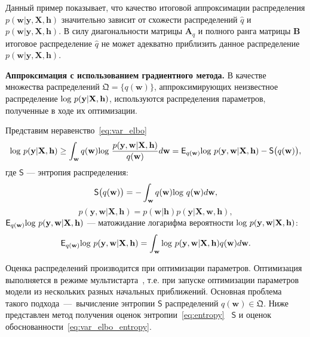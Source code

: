 \begin{example}
{Данный пример показывает, что качество итоговой аппроксимации распределения $p(\mathbf{w}|\mathbf{y}, \mathbf{X}, \mathbf{h})$ значительно зависит от схожести распределений $\hat{q}$ и $p(\mathbf{w}|\mathbf{y}, \mathbf{X}, \mathbf{h})$. В силу диагональности матрицы $\mathbf{A}_q$ и полного ранга матрицы $\mathbf{B}$  итоговое распределение $\hat{q}$ не может адекватно приблизить данное распределение  $p(\mathbf{w}|\mathbf{y}, \mathbf{X}, \mathbf{h})$.}

\end{example}

\textbf{Аппроксимация с использованием градиентного метода. }
В качестве множества распределений $\mathfrak{Q} = \{q(\mathbf{w})\}$, аппроксимирующих неизвестное распределение $\textnormal{log}~p(\mathbf{y}|\mathbf{X},\mathbf{h})$, используются распределения параметров, полученные в ходе их оптимизации.

Представим неравенство~\eqref{eq:var_elbo}
\begin{equation}
\label{eq:var_elbo_entropy}
 \textnormal{log}~p(\mathbf{y}|\mathbf{X},\mathbf{h}) \geq \int_\mathbf{w} q(\mathbf{w})\textnormal{log}~\frac{p(\mathbf{y},\mathbf{w}|\mathbf{X}, \mathbf{h})}{q(\mathbf{w})}d\mathbf{w} =  \mathsf{E}_{q(\mathbf{w)}} \textnormal{log~}p (\mathbf{y}, \mathbf{w}|\mathbf{X}, \mathbf{h}) - \mathsf{S}\bigl({q(\mathbf{w)}}\bigr),
\end{equation}
где $\mathsf{S}$ --- энтропия распределения:
\[
\mathsf{S}\bigl({q(\mathbf{w)}}\bigr) = - \int_{\mathbf{w}} q(\mathbf{w})\textnormal{log}~q(\mathbf{w})d\mathbf{w},
\]
$$p (\mathbf{y}, \mathbf{w}|\mathbf{X}, \mathbf{h}) = p (\mathbf{w}| \mathbf{h}) p (\mathbf{y}|\mathbf{X}, \mathbf{w}, \mathbf{h}),$$
$\mathsf{E}_{q(\mathbf{w)}}\textnormal{log~}p (\mathbf{y}, \mathbf{w}|\mathbf{X}, \mathbf{h})$ --- матожидание логарифма вероятности $\textnormal{log~}p (\mathbf{y}, \mathbf{w}|\mathbf{X}, \mathbf{h})$:
\[
	\mathsf{E}_{q(\mathbf{w)}}\textnormal{log~}p (\mathbf{y}, \mathbf{w}|\mathbf{X}, \mathbf{h})  = \int_\mathbf{w} \textnormal{log~}p (\mathbf{y}, \mathbf{w}|\mathbf{X}, \mathbf{h}) q(\mathbf{w}) d\mathbf{w}.
\]

Оценка распределений производится при оптимизации параметров. Оптимизация выполняется в режиме мультистарта~\cite{multi}, т.е. при запуске оптимизации параметров модели из нескольких разных начальных приближений. Основная проблема такого подхода~---~вычисление энтропии $\mathsf{S}$ распределений $q(\mathbf{w}) \in \mathfrak{Q}$. Ниже представлен метод получения оценок энтропии~\eqref{eq:entropy} ~$\mathsf{S}$ и оценок обоснованности~\eqref{eq:var_elbo_entropy}.

